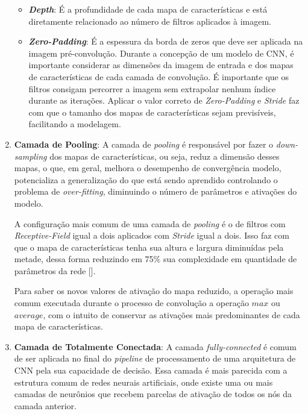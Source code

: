\begin{enumerate}
\begin{itemize}
                \item \textbf{\textit{Depth}}: É a profundidade de cada mapa de características e está diretamente relacionado ao número de 
                filtros aplicados à imagem.

                \item \textbf{\textit{Zero-Padding}}: É a espessura da borda de zeros que deve ser aplicada na imagem pré-convolução. Durante a concepção 
                de um modelo de CNN, é importante considerar as dimensões da imagem de entrada e dos mapas de características de cada 
                camada de convolução. É importante que os filtros consigam percorrer a imagem sem extrapolar nenhum índice durante as iterações. 
                Aplicar o valor correto de \textit{Zero-Padding} e \textit{Stride} faz com que o tamanho dos mapas de características sejam 
                previsíveis, facilitando a modelagem.
            \end{itemize}
            
    \item \textbf{Camada de Pooling}:
            A camada de \textit{pooling} é responsável por fazer o \textit{down-sampling} dos mapas de características, ou seja, reduz a dimensão 
            desses mapas, o que, em geral, melhora o desempenho de convergência modelo, potencializa a generalização do que está sendo aprendido 
            controlando o problema de \textit{over-fitting}, diminuindo o número de parâmetros e ativações do modelo.
            
            A configuração mais comum de uma camada de \textit{pooling} é o de filtros com \textit{Receptive-Field} igual a dois aplicados com 
            \textit{Stride} igual a dois. Isso faz com que o mapa de características tenha sua altura e largura diminuídas pela metade, dessa forma 
            reduzindo em 75\% sua complexidade em quantidade de parâmetros da rede [].
            
            Para saber os novos valores de ativação do mapa reduzido, a operação mais comum executada durante o processo de convolução a operação 
            $max$ ou $average$, com o intuito de conservar as ativações mais predominantes de cada mapa de características.
            
    \item \textbf{Camada de Totalmente Conectada}:
            A camada \textit{fully-connected} é comum de ser aplicada no final do \textit{pipeline} de processamento de uma arquitetura de 
            CNN pela sua capacidade de decisão. Essa camada é mais parecida com a estrutura comum de redes neurais artificiais, onde existe uma ou mais 
            camadas de neurônios que recebem parcelas de ativação de todos os nós da camada anterior.
            

\end{enumerate}
